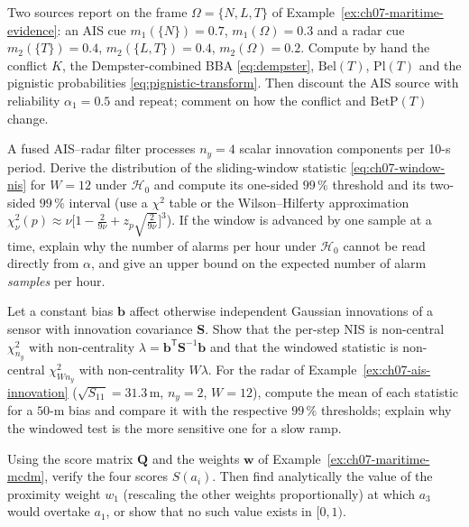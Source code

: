 \begin{prob}\label{prob:ch07:1}
Two sources report on the frame $\Omega=\{N,L,T\}$ of Example~\ref{ex:ch07-maritime-evidence}: an AIS cue $m_1(\{N\})=0.7$, $m_1(\Omega)=0.3$ and a radar cue $m_2(\{T\})=0.4$, $m_2(\{L,T\})=0.4$, $m_2(\Omega)=0.2$. Compute by hand the conflict $K$, the Dempster-combined BBA \eqref{eq:dempster}, $\mathrm{Bel}(T)$, $\mathrm{Pl}(T)$ and the pignistic probabilities \eqref{eq:pignistic-transform}. Then discount the AIS source with reliability $\alpha_1=0.5$ and repeat; comment on how the conflict and $\mathrm{BetP}(T)$ change.
\end{prob}
\begin{prob}\label{prob:ch07:2}
A fused AIS--radar filter processes $n_y=4$ scalar innovation components per 10-s period. Derive the distribution of the sliding-window statistic \eqref{eq:ch07-window-nis} for $W=12$ under $\mathcal{H}_0$ and compute its one-sided $99\,\%$ threshold and its two-sided $99\,\%$ interval (use a $\chi^{2}$ table or the Wilson--Hilferty approximation $\chi^{2}_{\nu}(p)\approx\nu\bigl[1-\tfrac{2}{9\nu}+z_p\sqrt{\tfrac{2}{9\nu}}\bigr]^{3}$). If the window is advanced by one sample at a time, explain why the number of alarms per hour under $\mathcal{H}_0$ cannot be read directly from $\alpha$, and give an upper bound on the expected number of alarm \emph{samples} per hour.
\end{prob}
\begin{prob}\label{prob:ch07:3}
Let a constant bias $\mathbf{b}$ affect otherwise independent Gaussian innovations of a sensor with innovation covariance $\mathbf{S}$. Show that the per-step NIS is non-central $\chi^{2}_{n_y}$ with non-centrality $\lambda=\mathbf{b}^{\mathsf T}\mathbf{S}^{-1}\mathbf{b}$ and that the windowed statistic is non-central $\chi^{2}_{Wn_y}$ with non-centrality $W\lambda$. For the radar of Example~\ref{ex:ch07-ais-innovation} ($\sqrt{S_{11}}=31.3$\,m, $n_y=2$, $W=12$), compute the mean of each statistic for a $50$-m bias and compare it with the respective $99\,\%$ thresholds; explain why the windowed test is the more sensitive one for a slow ramp.
\end{prob}
\begin{prob}\label{prob:ch07:4}
Using the score matrix $\mathbf{Q}$ and the weights $\mathbf{w}$ of Example~\ref{ex:ch07-maritime-mcdm}, verify the four scores $S(a_i)$. Then find analytically the value of the proximity weight $w_1$ (rescaling the other weights proportionally) at which $a_3$ would overtake $a_1$, or show that no such value exists in $[0,1)$.
\end{prob}
